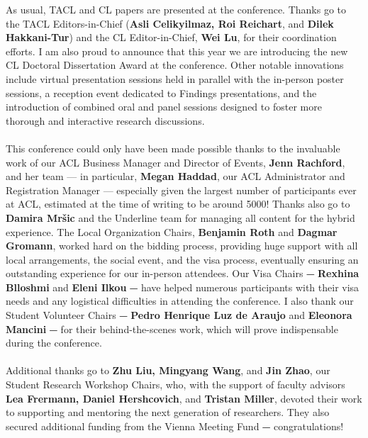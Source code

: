 As usual, TACL and CL papers are presented at the conference. Thanks go to the TACL Editors-in-Chief (\textbf{Asli Celikyilmaz, Roi Reichart}, and \textbf{Dilek Hakkani-Tur}) and the CL Editor-in-Chief, \textbf{Wei Lu}, for their coordination efforts. I am also proud to announce that this year we are introducing the new CL Doctoral Dissertation Award at the conference. Other notable innovations include virtual presentation sessions held in parallel with the in-person poster sessions, a reception event dedicated to Findings presentations, and the introduction of combined oral and panel sessions designed to foster more thorough and interactive research discussions.\\
\\

This conference could only have been made possible thanks to the invaluable work of our ACL Business Manager and Director of Events, \textbf{Jenn Rachford}, and her team — in particular, \textbf{Megan Haddad}, our ACL Administrator and Registration Manager — especially given the largest number of participants ever at ACL, estimated at the time of writing to be around 5000! Thanks also go to \textbf{Damira Mršic} and the Underline team for managing all content for the hybrid experience. The Local Organization Chairs, \textbf{Benjamin Roth} and \textbf{Dagmar Gromann}, worked hard on the bidding process, providing huge support with all local arrangements, the social event, and the visa process, eventually ensuring an outstanding experience for our in-person attendees. Our Visa Chairs ⏤ \textbf{Rexhina Blloshmi} and \textbf{Eleni Ilkou} ⏤ have helped numerous participants with their visa needs and any logistical difficulties in attending the conference. I also thank our Student Volunteer Chairs ⏤ \textbf{Pedro Henrique Luz de Araujo} and \textbf{Eleonora Mancini} ⏤ for their behind-the-scenes work, which will prove indispensable during the conference. \\
\\

Additional thanks go to \textbf{Zhu Liu, Mingyang Wang}, and \textbf{Jin Zhao}, our Student Research Workshop Chairs, who, with the support of faculty advisors \textbf{Lea Frermann, Daniel Hershcovich}, and \textbf{Tristan Miller}, devoted their work to supporting and mentoring the next generation of researchers. They also secured additional funding from the Vienna Meeting Fund ⏤ congratulations!\\
\\

